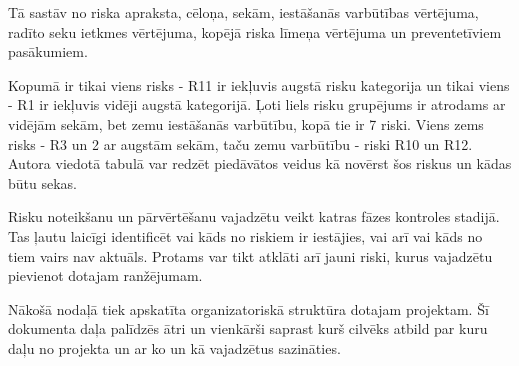 Tā sastāv no riska apraksta, cēloņa, sekām, iestāšanās varbūtības vērtējuma, radīto seku ietkmes vērtējuma, kopējā 
riska līmeņa vērtējuma un preventetīviem pasākumiem.
\par
Kopumā ir tikai viens risks - R11 ir iekļuvis augstā risku kategorija un tikai viens - R1 ir iekļuvis vidēji augstā
kategorijā. Ļoti liels risku grupējums ir atrodams ar vidējām sekām, bet zemu iestāšanās varbūtību, kopā tie ir 7 riski.
Viens zems risks - R3 un 2 ar augstām sekām, taču zemu varbūtību - riski R10 un R12. Autora viedotā tabulā var redzēt
piedāvātos veidus kā novērst šos riskus un kādas būtu sekas. 
\par
Risku noteikšanu un pārvērtēšanu vajadzētu veikt katras fāzes kontroles stadijā. Tas ļautu laicīgi identificēt vai
kāds no riskiem ir iestājies, vai arī vai kāds no tiem vairs nav aktuāls. Protams var tikt atklāti arī jauni riski,
kurus vajadzētu pievienot dotajam ranžējumam.
\par
Nākošā nodaļā tiek apskatīta organizatoriskā struktūra dotajam projektam. Šī dokumenta daļa palīdzēs ātri un vienkārši
saprast kurš cilvēks atbild par kuru daļu no projekta un ar ko un kā vajadzētus sazināties.


